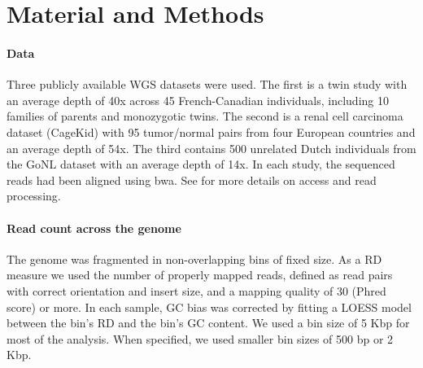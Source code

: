 \section{Material and Methods}

\paragraph{Data}
Three publicly available WGS datasets were used.
The first is a twin study\cite{Boivin2013} with an average depth of 40x across 45 French-Canadian individuals, including 10 families of parents and monozygotic twins.
The second is a renal cell carcinoma dataset\cite{Scelo2014} (CageKid) with 95 tumor/normal pairs from four European countries and an average depth of 54x.
The third contains 500 unrelated Dutch individuals from the GoNL\cite{Francioli2014} dataset with an average depth of 14x.
In each study, the sequenced reads had been aligned using {\sf bwa}\cite{Li2010}.
See  for more details on access and read processing.

\paragraph{Read count across the genome}
The genome was fragmented in non-overlapping bins of fixed size.
As a RD measure we used the number of properly mapped reads, defined as read pairs with correct orientation and insert size, and a mapping quality of 30 (Phred score) or more.
In each sample, GC bias was corrected by fitting a LOESS model between the bin's RD and the bin's GC content.
We used a bin size of 5 Kbp for most of the analysis.
When specified, we used smaller bin sizes of 500 bp or 2 Kbp.

